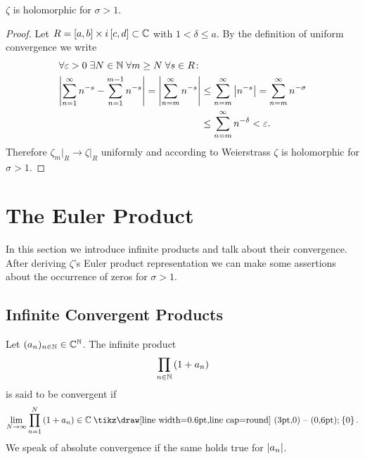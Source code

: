 \begin{theorem}
	$\zeta$ is holomorphic for $\sigma > 1$.
\end{theorem}
\begin{proof}
	Let $R = \left[a, b\right] \times i\left[c, d\right] \subset \mathbb{C}$ with $1 < \delta \leq a$. By the definition of uniform convergence we write
\begin{equation*}
\begin{aligned}
	&\forall \varepsilon > 0 \; \exists N \in \mathbb{N} \; \forall m \geq N \; \forall s \in R \colon \\
	&\begin{aligned}
	\left|\sum _{n = 1} ^\infty n^{-s} - \sum _{n = 1} ^{m - 1} n^{-s}\right|
	= \left|\sum _{n = m} ^\infty n^{-s}\right|
	&\leq \sum _{n = m} ^\infty \left|n^{-s}\right|
	= \sum _{n = m} ^\infty n^{-\sigma} \\
	&\leq \sum _{n = m} ^\infty n^{-\delta} < \varepsilon.
	\end{aligned}
\end{aligned}
\end{equation*}
	Therefore $\zeta_m \big\vert _R \to \zeta \big\vert _R$ uniformly and according to Weierstrass $\zeta$ is holomorphic for $\sigma > 1$.
\end{proof}


\section{The Euler Product}
In this section we introduce infinite products and talk about their convergence. After deriving $\zeta$'s Euler product representation we can make some assertions about the occurrence of zeros for $\sigma > 1$.


\subsection{Infinite Convergent Products}


\begin{definition}
	Let $(a_n)_{n \in \mathbb{N}} \in \mathbb{C}^{\mathbb{N}}$. The infinite product
\begin{equation*}
	\prod_{n \in \mathbb{N}} \left(1 + a_n\right)
\end{equation*}
	is said to be convergent if
\begin{equation*}
	\lim\limits_{N \to \infty} \prod _{n = 1} ^N \cbr{1 + a_n} \in \field{C} \mysetminus \fbr{0}.
\end{equation*}
	We speak of absolute convergence if the same holds true for $\left|a_n\right|$.
\end{definition}


